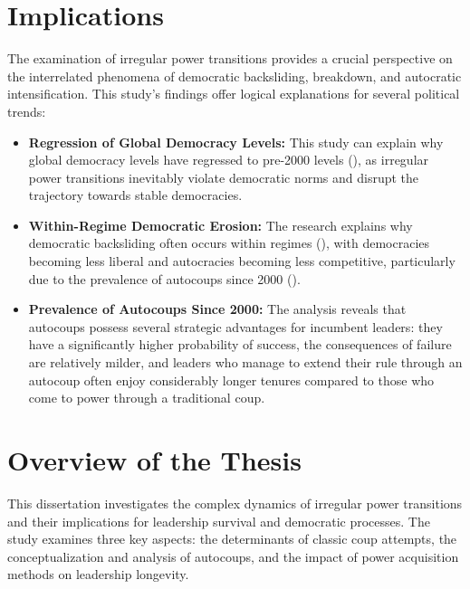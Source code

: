 \documentclass[
  12pt,
]{report}
\begin{document}
\section{Implications}\label{implications}

The examination of irregular power transitions provides a crucial
perspective on the interrelated phenomena of democratic backsliding,
breakdown, and autocratic intensification. This study's findings offer
logical explanations for several political trends:

\begin{itemize}
\item
  \textbf{Regression of Global Democracy Levels:} This study can explain
  why global democracy levels have regressed to pre-2000 levels
  (), as
  irregular power transitions inevitably violate democratic norms and
  disrupt the trajectory towards stable democracies.
\item
  \textbf{Within-Regime Democratic Erosion:} The research explains why
  democratic backsliding often occurs within regimes
  (),
  with democracies becoming less liberal and autocracies becoming less
  competitive, particularly due to the prevalence of autocoups since
  2000 ().
\item
  \textbf{Prevalence of Autocoups Since 2000:} The analysis reveals that
  autocoups possess several strategic advantages for incumbent leaders:
  they have a significantly higher probability of success, the
  consequences of failure are relatively milder, and leaders who manage
  to extend their rule through an autocoup often enjoy considerably
  longer tenures compared to those who come to power through a
  traditional coup.
\end{itemize}

\section{Overview of the Thesis}\label{overview-of-the-thesis}

This dissertation investigates the complex dynamics of irregular power
transitions and their implications for leadership survival and
democratic processes. The study examines three key aspects: the
determinants of classic coup attempts, the conceptualization and
analysis of autocoups, and the impact of power acquisition methods on
leadership longevity.
\end{document}

